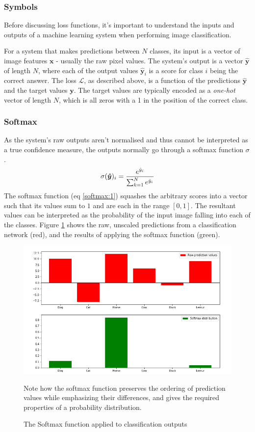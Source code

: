 \documentclass{report}
\begin{document}
\subsubsection{Symbols}
Before discussing loss functions, it's important to understand the inputs and outputs of a machine learning system when performing image classification. \par
For a system that makes predictions between $N$ classes, its input is a vector of image features $\bm{x}$ - usually the raw pixel values. The system's output is a vector $\bm{\hat{y}}$ of length $N$, where each of the output values $\bm{\hat{y}}_i$ is a score for class $i$ being the correct answer. The loss $\mathcal{L}$, as described above, is a function of the predictions $\bm{\hat{y}}$ and the target values $\bm{y}$. The target values are typically encoded as a \textit{one-hot} vector of length $N$, which is all zeros with a 1 in the position of the correct class. \\

\subsubsection{Softmax}
As the system's raw outputs aren't normalised and thus cannot be interpreted as a true confidence measure, the outputs normally go through a softmax function $\sigma$.
\begin{equation} \label{softmax:1}
 \sigma(\bm{\hat{y}})_i = \frac{e^{\hat{y}_i}}{\sum_{k=1}^{N}e^{\hat{y}_i}} \\
\end{equation}
The softmax function (eq \ref{softmax:1}) squashes the arbitrary scores into a vector such that its values sum to $1$ and are each in the range $[0, 1]$. The resultant values can be interpreted as the probability of the input image falling into each of the classes. Figure \ref{fig:softmax:1} shows the raw, unscaled predictions from a classification network (red), and the results of applying the softmax function (green). \par
\begin{figure}[h]
 \centering
 \includegraphics[width=12cm]{softmaxplot}
 \caption{The Softmax function applied to classification outputs}
 Note how the softmax function preserves the ordering of prediction values while emphasizing their differences, and gives the required properties of a probability distribution.
 \label{fig:softmax:1}
\end{figure}
\end{document}
